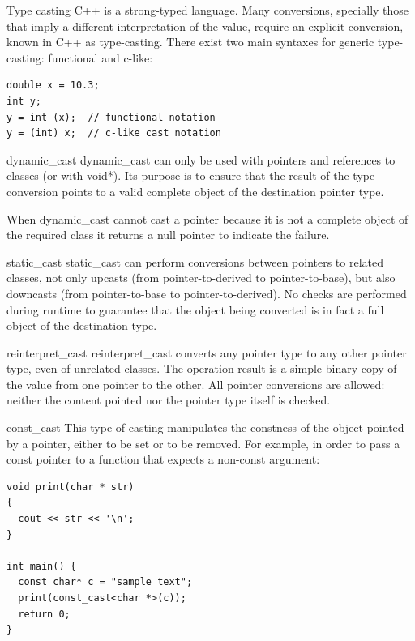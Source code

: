 \documentclass{beamer}
\begin{document}
\begin{frame}[fragile]{Type casting}
C++ is a strong-typed language. Many conversions, specially those that imply a
different interpretation of the value, require an explicit conversion, known in
C++ as type-casting. There exist two main syntaxes for generic type-casting:
functional and c-like:
\begin{lstlisting}
double x = 10.3;
int y;
y = int (x);  // functional notation
y = (int) x;  // c-like cast notation
\end{lstlisting}
\end{frame}

\begin{frame}{dynamic\_cast}
dynamic\_cast can only be used with pointers and references to classes
(or with void*). Its purpose is to ensure that the result of the type conversion points
to a valid complete object of the destination pointer type.

When dynamic\_cast cannot cast a pointer because it is not a complete object of
the required class it returns a null pointer to indicate the failure.
\end{frame}

\begin{frame}{static\_cast}
static\_cast can perform conversions between pointers to related classes, not
only upcasts (from pointer-to-derived to pointer-to-base), but also downcasts
(from pointer-to-base to pointer-to-derived). No checks are performed during
runtime to guarantee that the object being converted is in fact a full object of
the destination type.
\end{frame}

\begin{frame}{reinterpret\_cast}
reinterpret\_cast converts any pointer type to any other pointer type, even of
unrelated classes. The operation result is a simple binary copy of the value
from one pointer to the other. All pointer conversions are allowed: neither the
content pointed nor the pointer type itself is checked.
\end{frame}

\begin{frame}[fragile]{const\_cast}
This type of casting manipulates the constness of the object pointed by a
pointer, either to be set or to be removed. For example, in order to pass a
const pointer to a function that expects a non-const argument:
\begin{lstlisting}
void print(char * str)
{
  cout << str << '\n';
}

int main() {
  const char* c = "sample text";
  print(const_cast<char *>(c));
  return 0;
}
\end{lstlisting}
\end{frame}
\end{document}

